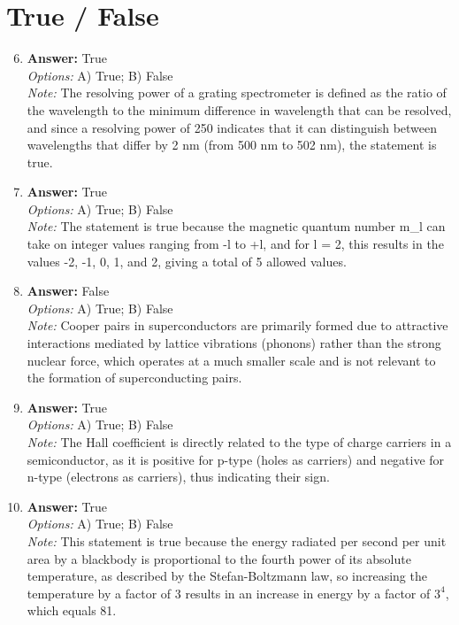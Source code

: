 \documentclass[12pt]{article}
\begin{document}
\section*{True / False}
\begin{enumerate}[label=\arabic*.]
\setcounter{enumi}{5}
\item \textbf{Answer:} True
\\ \textit{Options:} A) True; B) False
\\ \textit{Note:} The resolving power of a grating spectrometer is defined as the ratio of the wavelength to the minimum difference in wavelength that can be resolved, and since a resolving power of 250 indicates that it can distinguish between wavelengths that differ by 2 nm (from 500 nm to 502 nm), the statement is true.
\item \textbf{Answer:} True
\\ \textit{Options:} A) True; B) False
\\ \textit{Note:} The statement is true because the magnetic quantum number m\_l can take on integer values ranging from -l to +l, and for l = 2, this results in the values -2, -1, 0, 1, and 2, giving a total of 5 allowed values.
\item \textbf{Answer:} False
\\ \textit{Options:} A) True; B) False
\\ \textit{Note:} Cooper pairs in superconductors are primarily formed due to attractive interactions mediated by lattice vibrations (phonons) rather than the strong nuclear force, which operates at a much smaller scale and is not relevant to the formation of superconducting pairs.
\item \textbf{Answer:} True
\\ \textit{Options:} A) True; B) False
\\ \textit{Note:} The Hall coefficient is directly related to the type of charge carriers in a semiconductor, as it is positive for p-type (holes as carriers) and negative for n-type (electrons as carriers), thus indicating their sign.
\item \textbf{Answer:} True
\\ \textit{Options:} A) True; B) False
\\ \textit{Note:} This statement is true because the energy radiated per second per unit area by a blackbody is proportional to the fourth power of its absolute temperature, as described by the Stefan-Boltzmann law, so increasing the temperature by a factor of 3 results in an increase in energy by a factor of $3^4$, which equals 81.
\end{enumerate}
\end{document}
